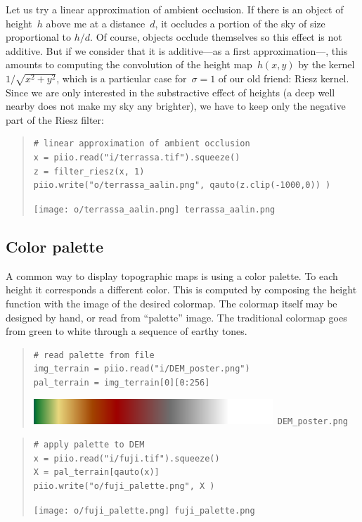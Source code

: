Let us try a linear approximation of ambient occlusion.  If there is an object
of height~$h$ above me at a distance~$d$, it occludes a portion of the sky of
size proportional to $h/d$.  Of course, objects occlude themselves so this
effect is not additive.  But if we consider that it is additive---as a first
approximation---, this amounts to computing the convolution of the height
map~$h(x,y)$ by the kernel~$1/\sqrt{x^2+y^2}$, which is a particular case
for~$\sigma=1$ of our old friend: Riesz kernel.  Since we are only interested
in the substractive effect of heights (a deep well nearby does not make my
sky any brighter), we have to keep only the negative part of the Riesz
filter:

\begin{quote}
\begin{verbatim}
# linear approximation of ambient occlusion
x = piio.read("i/terrassa.tif").squeeze()
z = filter_riesz(x, 1)
piio.write("o/terrassa_aalin.png", qauto(z.clip(-1000,0)) )
\end{verbatim}
\texttt{[image: o/terrassa\_aalin.png]}~\verb+terrassa_aalin.png+
\end{quote}



\clearpage
\subsection{Color palette}

A common way to display topographic maps is using a color palette.
To each height it corresponds a different color.  This is computed by
composing the height function with the image of the desired colormap.  The
colormap itself may be designed by hand, or read from ``palette'' image.
The traditional colormap goes from green to white through a sequence of
earthy tones.

\begin{quote}
\begin{verbatim}
# read palette from file
img_terrain = piio.read("i/DEM_poster.png")
pal_terrain = img_terrain[0][0:256]
\end{verbatim}
\includegraphics{i/DEM_poster.png}~\verb+DEM_poster.png+
\end{quote}

\begin{quote}
\begin{verbatim}
# apply palette to DEM
x = piio.read("i/fuji.tif").squeeze()
X = pal_terrain[qauto(x)]
piio.write("o/fuji_palette.png", X )
\end{verbatim}
\texttt{[image: o/fuji\_palette.png]}~\verb+fuji_palette.png+
\end{quote}

